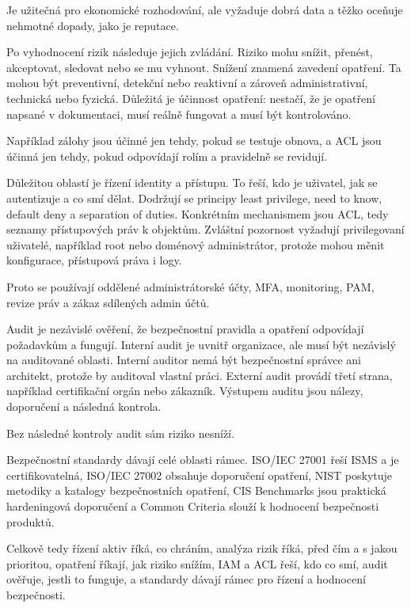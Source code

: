 Je užitečná pro ekonomické rozhodování, ale vyžaduje dobrá data a těžko oceňuje nehmotné dopady, jako je reputace.

Po vyhodnocení rizik následuje jejich zvládání. Riziko mohu snížit, přenést, akceptovat, sledovat nebo se mu vyhnout. Snížení znamená zavedení opatření. Ta mohou být preventivní, detekční nebo reaktivní a zároveň administrativní, technická nebo fyzická. Důležitá je účinnost opatření: nestačí, že je opatření napsané v dokumentaci, musí reálně fungovat a musí být kontrolováno.

Například zálohy jsou účinné jen tehdy, pokud se testuje obnova, a ACL jsou účinná jen tehdy, pokud odpovídají rolím a pravidelně se revidují.

Důležitou oblastí je řízení identity a přístupu. To řeší, kdo je uživatel, jak se autentizuje a co smí dělat. Dodržují se principy least privilege, need to know, default deny a separation of duties. Konkrétním mechanismem jsou ACL, tedy seznamy přístupových práv k objektům. Zvláštní pozornost vyžadují privilegovaní uživatelé, například root nebo doménový administrátor, protože mohou měnit konfigurace, přístupová práva i logy.

Proto se používají oddělené administrátorské účty, MFA, monitoring, PAM, revize práv a zákaz sdílených admin účtů.

Audit je nezávislé ověření, že bezpečnostní pravidla a opatření odpovídají požadavkům a fungují. Interní audit je uvnitř organizace, ale musí být nezávislý na auditované oblasti. Interní auditor nemá být bezpečnostní správce ani architekt, protože by auditoval vlastní práci. Externí audit provádí třetí strana, například certifikační orgán nebo zákazník. Výstupem auditu jsou nálezy, doporučení a následná kontrola.

Bez následné kontroly audit sám riziko nesníží.

Bezpečnostní standardy dávají celé oblasti rámec. ISO/IEC 27001 řeší ISMS a je certifikovatelná, ISO/IEC 27002 obsahuje doporučení opatření, NIST poskytuje metodiky a katalogy bezpečnostních opatření, CIS Benchmarks jsou praktická hardeningová doporučení a Common Criteria slouží k hodnocení bezpečnosti produktů.

Celkově tedy řízení aktiv říká, co chráním, analýza rizik říká, před čím a s jakou prioritou, opatření říkají, jak riziko snížím, IAM a ACL řeší, kdo co smí, audit ověřuje, jestli to funguje, a standardy dávají rámec pro řízení a hodnocení bezpečnosti.

